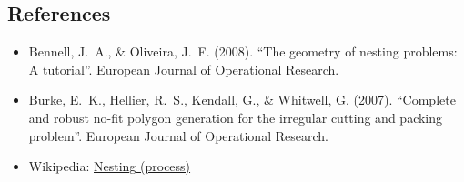 \subsection{References}
\begin{itemize}
    \item Bennell, J.~A., \& Oliveira, J.~F. (2008). ``The geometry of nesting problems: A tutorial''. European Journal of Operational Research.
    \item Burke, E.~K., Hellier, R.~S., Kendall, G., \& Whitwell, G. (2007). ``Complete and robust no-fit polygon generation for the irregular cutting and packing problem''. European Journal of Operational Research.
    \item Wikipedia: \href{https://en.wikipedia.org/wiki/Nesting_(process)}{Nesting (process)}
\end{itemize}

